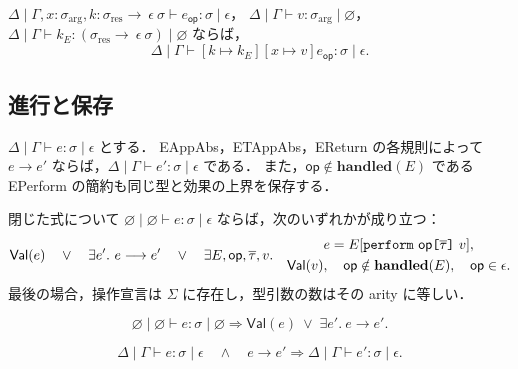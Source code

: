 \begin{lemma}[操作節の項置換]
\label{lem:fxi-operation-substitution}
$\Delta\mid\Gamma,x:\sigma_{\mathrm{arg}},
 k:\sigma_{\mathrm{res}}\rightarrow~\epsilon~\sigma
 \vdash e_{\mathsf{op}}:\sigma\mid\epsilon$，
$\Delta\mid\Gamma\vdash v:\sigma_{\mathrm{arg}}\mid\varnothing$，
$\Delta\mid\Gamma\vdash k_E:
 (\sigma_{\mathrm{res}}\rightarrow~\epsilon~\sigma)
 \mid\varnothing$ ならば，
\[
  \Delta\mid\Gamma\vdash
    [k\mapsto k_E][x\mapsto v]e_{\mathsf{op}}:
    \sigma\mid\epsilon.
\]
\end{lemma}

\subsection{進行と保存}

\begin{proposition}[基本簡約の型保存]
\label{prop:fxi-redex-preservation}
$\Delta\mid\Gamma\vdash e:\sigma\mid\epsilon$ とする．
EAppAbs，ETAppAbs，EReturn の各規則によって $e\longrightarrow e'$
ならば，$\Delta\mid\Gamma\vdash e':\sigma\mid\epsilon$ である．
また，$\mathsf{op}\notin\mathbf{handled}(E)$ である
EPerform の簡約も同じ型と効果の上界を保存する．
\end{proposition}

\begin{theorem}[Progress]
\label{thm:fxi-progress}
閉じた式について
$\varnothing\mid\varnothing\vdash e:\sigma\mid\epsilon$
ならば，次のいずれかが成り立つ：
\[
  \mathsf{Val}(e)
  \quad\lor\quad
  \exists e'.\ e\longrightarrow e'
  \quad\lor\quad
  \exists E,\mathsf{op},\overline{\tau},v.\quad
    \begin{gathered}
      e=E[\texttt{perform}~\mathsf{op}
          \texttt{[} \overline{\tau} \texttt{]}~v],\\
      \mathsf{Val}(v),\quad
      \mathsf{op}\notin\mathbf{handled}(E),\quad
      \mathsf{op}\in\epsilon.
    \end{gathered}
\]
最後の場合，操作宣言は $\Sigma$ に存在し，型引数の数はその arity に等しい．
\end{theorem}

\begin{proposition}
\label{prop:fxi-empty-progress}
\[
  \varnothing\mid\varnothing\vdash
    e:\sigma\mid\varnothing
  \Longrightarrow
  \mathsf{Val}(e)
  \ \lor\;
  \exists e'.\ e\longrightarrow e'.
\]
\end{proposition}

\begin{theorem}[Preservation]
\label{thm:fxi-preservation}
\[
  \Delta\mid\Gamma\vdash e:\sigma\mid\epsilon
  \quad\land\quad
  e\longrightarrow e'
  \Longrightarrow
  \Delta\mid\Gamma\vdash e':\sigma\mid\epsilon.
\]
\end{theorem}

